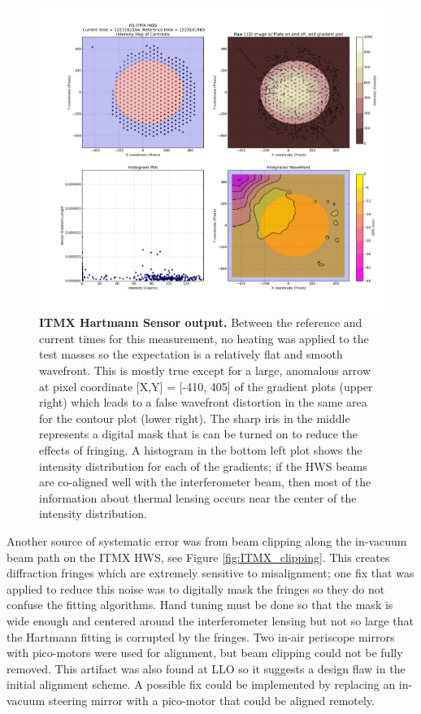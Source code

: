 	\begin{figure}[!]
		\centering
		\includegraphics[width=0.7\textheight]{../Figures/20181011_ITMX_HWS_histogram_Masked.png}
		\caption[ITMX Hartmann Sensor output.] 
		{\textbf{ITMX Hartmann Sensor output.} Between the reference and current times for this measurement, no heating was applied to the test masses so the expectation is a relatively flat and smooth wavefront. This is mostly true except for a large, anomalous arrow at pixel coordinate [X,Y] = [-410, 405] of the gradient plots (upper right) which leads to a false wavefront distortion in the same area for the contour plot (lower right).  The sharp iris in the middle represents a digital mask that is can be turned on to reduce the effects of fringing.  A histogram in the bottom left plot shows the intensity distribution for each of the gradients; if the HWS beams are co-aligned well with the interferometer beam, then most of the information about thermal lensing occurs near the center of the intensity distribution.}
		\label{fig:HWS_Histogram}
	\end{figure}
	Another source of systematic error was from beam clipping along the in-vacuum beam path on the ITMX HWS, see Figure \ref{fig:ITMX_clipping}. This creates diffraction fringes which are extremely sensitive to misalignment; one fix that was applied to reduce this noise was to digitally mask the fringes so they do not confuse the fitting algorithms.  Hand tuning must be done so that the mask is wide enough and centered around the interferometer lensing but not so large that the Hartmann fitting is corrupted by the fringes. Two in-air periscope mirrors with pico-motors were used for alignment, but beam clipping could not be fully removed.  This artifact was also found at LLO so it suggests a design flaw in the initial alignment scheme.  A possible fix could be implemented by replacing an in-vacuum steering mirror with a pico-motor that could be aligned remotely.

